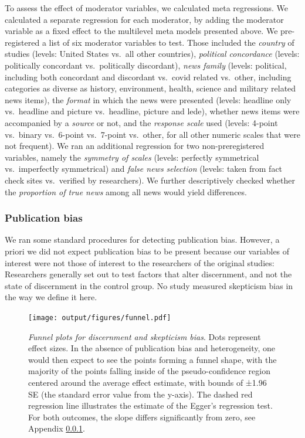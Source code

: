 \documentclass[
  doc,floatsintext]{apa6}
\begin{document}
To assess the effect of moderator variables, we calculated meta regressions. We calculated a separate regression for each moderator, by adding the moderator variable as a fixed effect to the multilevel meta models presented above. We pre-registered a list of six moderator variables to test. Those included the \emph{country} of studies (levels: United States vs.~all other countries), \emph{political concordance} (levels: politically concordant vs.~politically discordant), \emph{news family} (levels: political, including both concordant and discordant vs.~covid related vs.~other, including categories as diverse as history, environment, health, science and military related news items), the \emph{format} in which the news were presented (levels: headline only vs.~headline and picture vs.~headline, picture and lede), whether news items were accompanied by a \emph{source} or not, and the \emph{response scale} used (levels: 4-point vs.~binary vs.~6-point vs.~7-point vs.~other, for all other numeric scales that were not frequent). We ran an additional regression for two non-preregistered variables, namely the \emph{symmetry of scales} (levels: perfectly symmetrical vs.~imperfectly symmetrical) and \emph{false news selection} (levels: taken from fact check sites vs.~verified by researchers). We further descriptively checked whether the \emph{proportion of true news} among all news would yield differences.

\subsubsection{Publication bias}\label{publication-bias}

We ran some standard procedures for detecting publication bias. However, a priori we did not expect publication bias to be present because our variables of interest were not those of interest to the researchers of the original studies: Researchers generally set out to test factors that alter discernment, and not the state of discernment in the control group. No study measured skepticism bias in the way we define it here.



\begin{figure}
\centering
\texttt{[image: output/figures/funnel.pdf]}
\caption{\label{fig:funnel}\emph{Funnel plots for discernment and skepticism bias}. Dots represent effect sizes. In the absence of publication bias and heterogeneity, one would then expect to see the points forming a funnel shape, with the majority of the points falling inside of the pseudo-confidence region centered around the average effect estimate, with bounds of ±1.96 SE (the standard error value from the y-axis). The dashed red regression line illustrates the estimate of the Egger's regression test. For both outcomes, the slope differs significantly from zero, see Appendix \ref{publication-bias}.}
\end{figure}
\end{document}
